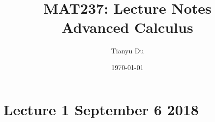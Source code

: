 \documentclass[]{article}
\title{MAT237: Lecture Notes \\ \small Advanced Calculus}
\date{\today}
\author{Tianyu Du}
\begin{document}
    \maketitle
    \tableofcontents
    
    \newpage
    
    \section{Lecture 1 September 6 2018}
    
    
\end{document}
